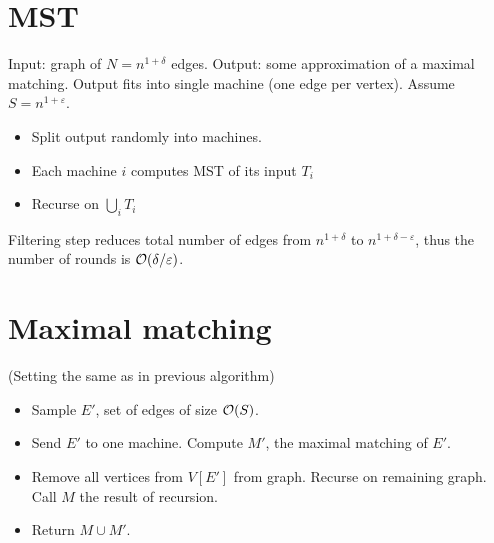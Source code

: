 \documentclass[11pt]{article}
\begin{document}
\section{MST}
Input: graph of $N = n^{1+\delta}$ edges. Output: some approximation of a maximal matching. Output fits into single machine (one edge per vertex). Assume $S = n^{1+\varepsilon}$.
\begin{itemize}
\item Split output randomly into machines.
\item Each machine $i$ computes MST of its input $T_i$
\item Recurse on $\bigcup_i T_i$
\end{itemize}

Filtering step reduces total number of edges from $n^{1+\delta}$ to $n^{1+\delta-\varepsilon}$, thus the number of rounds is $\mathcal{O}(\delta/\varepsilon)$.


\section{Maximal matching}
(Setting the same as in previous algorithm)

\begin{itemize}
\item Sample $E'$, set of edges of size $\mathcal{O}(S)$. 
\item Send $E'$ to one machine. Compute $M'$, the maximal matching of $E'$.
\item Remove all vertices from $V[E']$ from graph. Recurse on remaining graph. Call $M$ the result of recursion.
\item Return $M \cup M'$.
\end{itemize}
\end{document}
